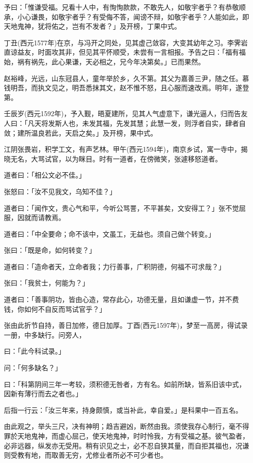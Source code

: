 \documentclass[letterpaper,10pt,english]{sphinxmanual}
\begin{document}
予曰：「惟谦受福。兄看十人中，有恂恂款款，不敢先人，如敬宇者乎？有恭敬顺承，小心谦畏，如敬宇者乎？有受侮不答，闻谤不辩，如敬宇者乎？人能如此，即天地鬼神，犹将佑之，岂有不发者？」及开榜，丁果中式。

丁丑(西元1577年)在京，与冯开之同处，见其虚己敛容，大变其幼年之习。李霁岩直谅益友，时面攻其非，但见其平怀顺受，未尝有一言相报。予告之曰：「福有福始，祸有祸先，此心果谦，天必相之，兄今年决第矣。」已而果然。

赵裕峰，光远，山东冠县人，童年举於乡，久不第。其父为嘉善三尹，随之任。慕钱明吾，而执文见之，明吾悉抹其文，赵不惟不怒，且心服而速改焉。明年，遂登第。

壬辰岁(西元1592年)，予入觐，晤夏建所，见其人气虚意下，谦光逼人，归而告友人曰：「凡天将发斯人也，未发其福，先发其慧；此慧一发，则浮者自实，肆者自敛；建所温良若此，天启之矣。」及开榜，果中式。

江阴张畏岩，积学工文，有声艺林。甲午(西元1594年)，南京乡试，寓一寺中，揭晓无名，大骂试官，以为眯目。时有一道者，在傍微笑，张遽移怒道者。

道者曰：「相公文必不佳。」

张怒曰：「汝不见我文，乌知不佳？」

道者曰：「闻作文，贵心气和平，今听公骂詈，不平甚矣，文安得工？」张不觉屈服，因就而请教焉。

道者曰：「中全要命；命不该中，文虽工，无益也。须自己做个转变。」

张曰：「既是命，如何转变？」

道者曰：「造命者天，立命者我；力行善事，广积阴德，何福不可求哉？」

张曰：「我贫士，何能为？」

道者曰：「善事阴功，皆由心造，常存此心，功德无量，且如谦虚一节，并不费钱，你如何不自反而骂试官乎？」

张由此折节自持，善日加修，德日加厚。丁酉(西元1597年)，梦至一高房，得试录一册，中多缺行。问旁人，

曰：「此今科试录。」

问：「何多缺名？」

曰：「科第阴间三年一考较，须积德无咎者，方有名。如前所缺，皆系旧该中式，因新有薄行而去之者也。」

后指一行云：「汝三年来，持身颇慎，或当补此，幸自爱。」是科果中一百五名。

由此观之，举头三尺，决有神明；趋吉避凶，断然由我。须使我存心制行，毫不得罪於天地鬼神，而虚心屈己，使天地鬼神，时时怜我，方有受福之基。彼气盈者，必非远器，纵发亦无受用。稍有识见之士，必不忍自狭其量，而自拒其福也，况谦则受教有地，而取善无穷，尤修业者所必不可少者也。
\end{document}
